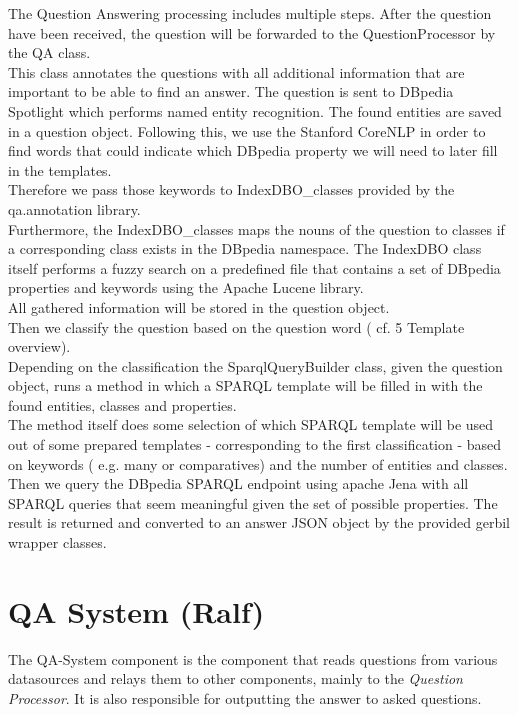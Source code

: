 \documentclass[runningheads]{llncs}
\begin{document}
The Question Answering processing includes multiple steps. After the question have been received, the question will be forwarded to the QuestionProcessor by the QA class. \\
This class annotates the questions with all additional information that are important to be able to find an answer. 
The question is sent to DBpedia Spotlight which performs named entity recognition. The found entities are saved in a question object. 
Following this, we use the Stanford CoreNLP in order to find words that could indicate which DBpedia property we will need to later fill in the templates. \\
Therefore we pass those keywords to  IndexDBO\_classes provided by the qa.annotation library. \\
Furthermore, the IndexDBO\_classes maps the nouns of the question to classes if a corresponding class exists in the DBpedia namespace. The IndexDBO class itself performs a fuzzy search on a predefined file that contains a set of DBpedia properties and keywords using the Apache Lucene library. \\
All gathered information will be stored in the question object. \\
Then we classify the question based on the question word ( cf. 5 Template overview). \\
Depending on the classification the SparqlQueryBuilder class, given the question object, runs a method in which a SPARQL template will be filled in with the found entities, classes and properties. \\
The method itself does some selection of which SPARQL template will be used out of some prepared templates - corresponding to the first classification - based on keywords ( e.g. many or comparatives) and the number of entities and classes. \\
Then we query the DBpedia SPARQL endpoint using apache Jena with all SPARQL queries that seem meaningful given the set of possible properties.
The result is returned and converted to an answer JSON object by the provided gerbil wrapper classes. \\


\section{QA System (Ralf)}

The QA-System component is the component that reads questions from various datasources and relays them to other components, mainly to the \emph{Question Processor}. It is also responsible for outputting the answer to asked questions. \\
	
\end{document}
